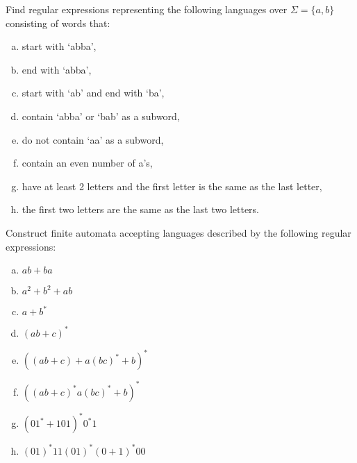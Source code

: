 \documentclass[a4paper,12pt]{amsart}
\begin{document}
\medskip\begin{problem}

    Find regular expressions representing the following languages over $\Sigma = \{a, b\}$ consisting of words that:

    \medskip
    

        \begin{enumerate}[(a)]\setlength\itemsep{12pt}
            \item start with `abba',
            \item end with  `abba',
            \item start with `ab' and end with `ba',
            \item contain `abba' or `bab' as a subword,
            \item do not contain `aa' as a subword,
            \item contain an even number of a's,
            \item have at least 2 letters and the first letter is the same as the last letter,
            \item the first two letters are the same as the last two letters.
        \end{enumerate}


\end{problem}
    
    
\medskip\begin{problem}

    Construct finite automata accepting languages described by the following regular expressions:
    
    \begin{multicols}{2}
    
        \begin{enumerate}[(a)]\setlength\itemsep{12pt}
            \item $ab + ba$
            \item $a^2 + b^2 + ab$
            \item $a + b^*$
            \item $(ab + c)^*$
            \item $((ab + c)+a(bc)^* + b)^*$
            \item $((ab + c)^*a(bc)^* + b)^*$
            \item $(01^* + 101)^*0^*1$
            \item $(01)^*11(01)^*(0 + 1)^*00$
        \end{enumerate}
    
    \end{multicols}
    
\end{problem}
\end{document}

